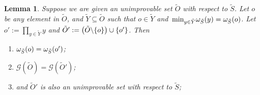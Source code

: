 \documentclass[twocolumn,showpacs,preprintnumbers,amsmath,amssymb,nofootinbib,pra,floatfix]{revtex4-1}
\newtheorem{lemma}{Lemma}
\newcommand{\set}{\tilde}
\newcommand{\genfun}{\mathcal{G}}
\begin{document}
\begin{lemma}
\label{replacing element with product preserves unimprovability}
Suppose we are given an unimprovable set $\set O$ with respect to $\set S$.  Let $o$ be any element in $\set O$, and $\set Y\subseteq \set O$ such that $o\in \set Y$ and $\min_{y\in\set Y}\om_{\set S}(y)=\om_{\set S}(o)$.  Let $o':=\prod_{y\in\set Y}y$ and $\set O' := \paren{\set O\backslash\{o\}}\cup\{o'\}$.  Then
\begin{enumerate}
\item $\om_{\set S}(o)=\om_{\set S}(o')$;
\item $\genfun(\set O)=\genfun(\set O')$;
\item and $\set O'$ is also an unimprovable set with respect to $\set S$;
\end{enumerate}
\end{lemma}
\end{document}
